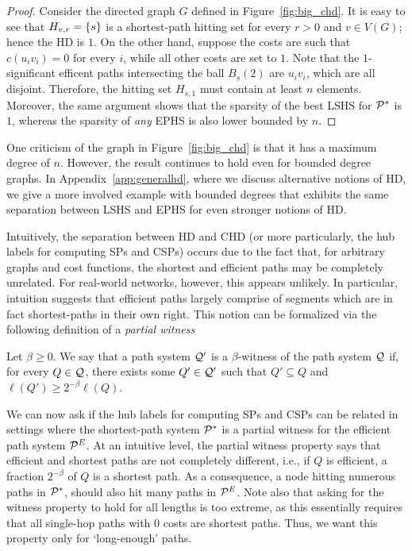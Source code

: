 \begin{proof}
	Consider the directed graph $G$ defined in Figure~\ref{fig:big_chd}.
	It is easy to see that $H_{v,r}=\{s\}$ is a shortest-path hitting set for every $r>0$ and $v\in V(G)$; hence the HD is $1$.
	On the other hand, suppose the costs are such that $c(u_iv_i)=0$ for every $i$, while all other costs are set to $1$.
	Note that the $1$-significant efficent paths intersecting the ball $B_s(2)$ are $u_iv_i$, which are all disjoint.
	Therefore, the hitting set $H_{s,1}$ must contain at least $n$ elements. Moreover, the same argument shows that the sparsity of the best LSHS for $\mathcal{P}^*$ is $1$, whereas the sparsity of \emph{any} EPHS is also lower bounded by $n$.
\end{proof}

\begin{remark}
	One criticism of the graph in Figure~\ref{fig:big_chd} is that it has a maximum degree of $n$.
	However, the result continues to hold even for bounded degree graphs.
	In Appendix~\ref{app:generalhd}, where we discuss alternative notions of HD, we give a more involved example with bounded degrees that exhibits the same separation between LSHS and EPHS for even stronger notions of HD.
\end{remark}

Intuitively, the separation between HD and CHD (or more particularly, the hub labels for computing SPs and CSPs) occurs due to the fact that, for arbitrary graphs and cost functions, the shortest and efficient paths may be completely unrelated. 
For real-world networks, however, this appears unlikely.
In particular, intuition suggests that efficient paths largely comprise of segments which are in fact shortest-paths in their own right. 
This notion can be formalized via the following definition of a \emph{partial witness} 
\begin{definition}
	Let $\beta\geq 0$.
	We say that a path system $\mathcal{Q}'$ is a $\beta$-witness of the path system $\mathcal{Q}$ if, for every $Q\in\mathcal{Q}$, there exists some $Q'\in\mathcal{Q}'$ such that $Q'\subseteq Q$ and $\ell(Q')\geq 2^{-\beta}\ell(Q)$.
\end{definition}
We can now ask if the hub labels for computing SPs and CSPs can be related in settings where the shortest-path system $\mathcal{P}^*$ is a partial witness for the efficient path system $\mathcal{P}^E$.
At an intuitive level, the partial witness property says that efficient and shortest paths are not completely different, i.e., if $Q$ is efficient, a fraction $2^{-\beta}$ of $Q$ is a shortest path.
As a consequence, a node hitting numerous paths in $\mathcal{P}^*$, should also hit many paths in $\mathcal{P}^E$.
Note also that asking for the witness property to hold for all lengths is too extreme, as this essentially requires that all single-hop paths with 0 costs are shortest paths.
Thus, we want this property only for `long-enough' paths. 

